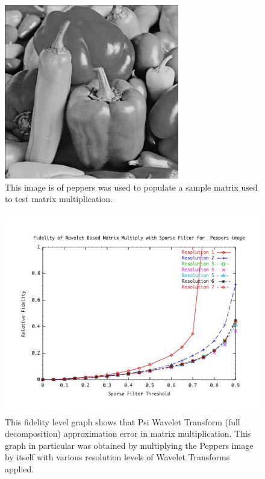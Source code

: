 \begin{figure}[ht]
\begin{center}\includegraphics [width=3in]{peppers.jpg}\end{center}
\caption{This image is of peppers was used to populate a sample matrix used to test matrix multiplication.  }
\label{imagePeppers}
\end{figure}

\begin{figure}[ht]
\begin{center}\includegraphics [width=5in]{peppersresultsA.jpg}\end{center}
\caption{This fidelity level graph shows that Psi Wavelet Transform (full decomposition) approximation error in matrix multiplication.  This graph in particular was obtained by multiplying the Peppers image by itself with various resolution levels of Wavelet Transforms applied\cite{peppers}. }
\label{imagepeppersFidelity}
\end{figure}

